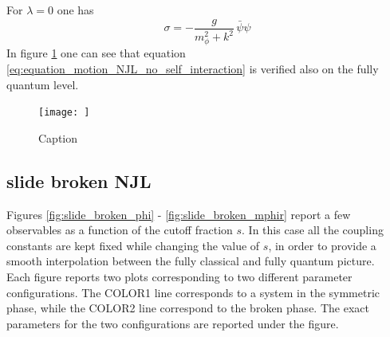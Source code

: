 For $\lambda = 0$ one has
\begin{equation}
    \sigma = -\frac{g}{m_\phi^2 + k^2} \, \bar\psi \psi
    \label{eq:equation_motion_NJL_no_self_interaction}
\end{equation}
In figure \ref{fig:equation_motion_NJL} one can see that equation \eqref{eq:equation_motion_NJL_no_self_interaction} is verified also on the fully quantum level.
\begin{figure}
    \centering
    \texttt{[image: ]}
    \caption{Caption}
    \label{fig:equation_motion_NJL}
\end{figure}


\subsection{slide broken NJL}
Figures \ref{fig:slide_broken_phi} - \ref{fig:slide_broken_mphir} report a few observables as a function of the cutoff fraction $s$. In this case all the coupling constants are kept fixed while changing the value of $s$, in order to provide a smooth interpolation between the fully classical and fully quantum picture. \\
Each figure reports two plots corresponding to two different parameter configurations. The COLOR1 line corresponds to a system in the symmetric phase, while the COLOR2 line correspond to the broken phase. The exact parameters for the two configurations are reported under the figure.
